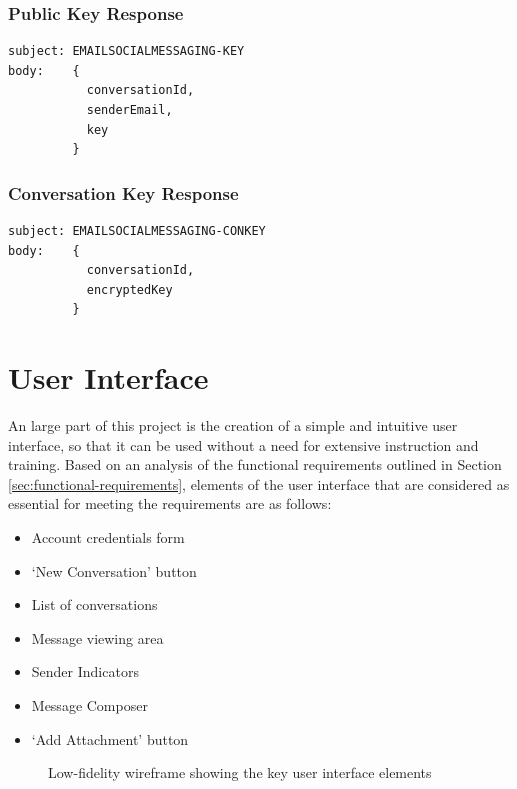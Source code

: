 \subsubsection{Public Key Response}
\begin{verbatim}
subject: EMAILSOCIALMESSAGING-KEY
body:    {
           conversationId,
           senderEmail,
           key
         }
\end{verbatim}

\subsubsection{Conversation Key Response}
\begin{verbatim}
subject: EMAILSOCIALMESSAGING-CONKEY
body:    {
           conversationId,
           encryptedKey
         }
\end{verbatim}

\section{User Interface}\label{sec:ui-design}

An large part of this project is the creation of a simple and intuitive user interface, so that it can be used without a need for extensive instruction and training. Based on an analysis of the functional requirements outlined in Section \ref{sec:functional-requirements}, elements of the user interface that are considered as essential for meeting the requirements are as follows:
\begin{itemize}
  \item Account credentials form
  \item `New Conversation' button
  \item List of conversations
  \item Message viewing area
  \item Sender Indicators
  \item Message Composer
  \item `Add Attachment' button
\end{itemize}

\begin{figure}[h!]
  \centering
  \caption{Low-fidelity wireframe showing the key user interface elements}
  \label{fig:ui-wireframes}
\end{figure}


